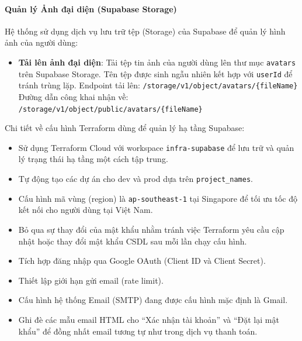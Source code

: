 \paragraph{Quản lý Ảnh đại diện (Supabase Storage)}

Hệ thống sử dụng dịch vụ lưu trữ tệp (Storage) của Supabase để quản lý hình ảnh của người dùng:

\begin{itemize}
\item \textbf{Tải lên ảnh đại diện}:
Tải tệp tin ảnh của người dùng lên thư mục \texttt{avatars} trên Supabase Storage. Tên tệp được sinh ngẫu nhiên kết hợp với \texttt{userId} để tránh trùng lặp.
Endpoint tải lên: \texttt{/storage/v1/object/avatars/\{fileName\}}
Đường dẫn công khai nhận về: \texttt{/storage/v1/object/public/avatars/\{fileName\}}
\end{itemize}

Chi tiết về cấu hình Terraform dùng để quản lý hạ tầng Supabase:

\begin{itemize}
\item Sử dụng Terraform Cloud với workspace \texttt{infra-supabase} để lưu trữ và quản lý trạng thái hạ tầng một cách tập trung.

\item Tự động tạo các dự án cho dev và prod dựa trên \texttt{project\_names}.

\item Cấu hình mã vùng (region) là \texttt{ap-southeast-1} tại Singapore để tối ưu tốc độ kết nối cho người dùng tại Việt Nam.

\item Bỏ qua sự thay đổi của mật khẩu nhằm tránh việc Terraform yêu cầu cập nhật hoặc thay đổi mật khẩu CSDL sau mỗi lần chạy cấu hình.

\item Tích hợp đăng nhập qua Google OAuth (Client ID và Client Secret).

\item Thiết lập giới hạn gửi email (rate limit).

\item Cấu hình hệ thống Email (SMTP) đang được cấu hình mặc định là Gmail.

\item Ghi đè các mẫu email HTML cho \enquote{Xác nhận tài khoản} và \enquote{Đặt lại mật khẩu} để đồng nhất email tương tự như trong dịch vụ thanh toán.
\end{itemize}


